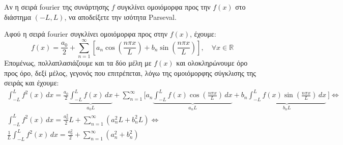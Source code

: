 \documentclass[a4paper,table]{report}
\begin{document}
\begin{mybox3}
\begin{example}
  Αν η σειρά \textlatin{fourier} της συνάρτησης $f$ συγκλίνει ομοιόμορφα προς την $f(x)$ στο 
  διάστημα $ (-L,L) $, να αποδείξετε την ισότητα \textlatin{Parseval}.
\end{example}
\end{mybox3}
\begin{solution}
  Αφού η σειρά \textlatin{fourier} συγκλίνει ομοιόμορφα προς στην $ f(x) $, έχουμε:
  \[
    f(x) = \frac{a_{0}}{2} + \sum_{n=1}^{\infty} \left[a_{n} 
    \cos{\left(\frac{n \pi x}{L}\right)} + b_{n} \sin{\left(\frac{n \pi x}{L}\right)}\right], 
    \quad \forall x \in \mathbb{R} 
  \] 
  Επομένως, πολλαπλασιάζουμε και τα δύο μέλη με $ f(x) $ και ολοκληρώνουμε όρο 
  προς όρο, δεξί μέλος, γεγονός που επιτρέπεται, λόγω της ομοιόμορφης σύγκλισης της 
  σειράς και έχουμε:
  \begin{gather*}
    \int _{-L}^{L} f^{2}(x) \,{dx} 
    = \frac{a_{0}}{2} \underbrace{\int _{-L}^{L} f(x) \,{dx}}_{a_{0}L} + 
    \sum_{n=1}^{\infty} \Biggl[a_{n} \underbrace{\int _{-L}^{L} f(x) 
      \cos{\left(\frac{n \pi x}{L}\right)} \,{dx}}_{a_{n}L} + b_{n} 
      \underbrace{\int _{-L}^{L} f(x) \sin{\left(\frac{n \pi x}{L}\right)} 
    \,{dx}}_{b_{n}L} \ \Biggr] \Leftrightarrow \\ 
    \int _{-L}^{L} f^{2}(x) \,{dx}  = \frac{a_{0}^{2}}{2} L + 
    \sum_{n=1}^{\infty} (a_{n}^{2}L+b_{n}^{2}L) \Leftrightarrow \\
    \frac{1}{L} \int _{-L}^{L} f^{2}(x) \,{dx}  = \frac{a_{0}^{2}}{2}
    + \sum_{n=1}^{\infty} (a_{n}^{2}+b_{n}^{2}) \\
  \end{gather*}
\end{solution}

\enlargethispage*{\baselineskip}
\end{document}
